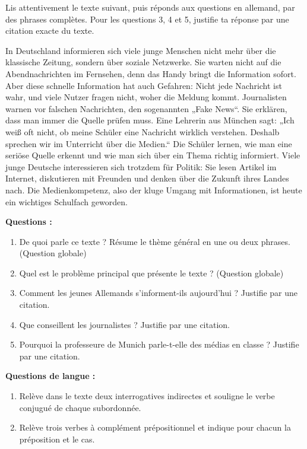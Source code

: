 \documentclass[11pt]{article}
\begin{document}
\begin{exercice}
Lis attentivement le texte suivant, puis réponds aux questions en allemand, par des phrases complètes. Pour les questions 3, 4 et 5, justifie ta réponse par une citation exacte du texte.

\begin{textebox}
In Deutschland informieren sich viele junge Menschen nicht mehr über die klassische Zeitung, sondern über soziale Netzwerke. Sie warten nicht auf die Abendnachrichten im Fernsehen, denn das Handy bringt die Information sofort. Aber diese schnelle Information hat auch Gefahren: Nicht jede Nachricht ist wahr, und viele Nutzer fragen nicht, woher die Meldung kommt. Journalisten warnen vor falschen Nachrichten, den sogenannten „Fake News“. Sie erklären, dass man immer die Quelle prüfen muss. Eine Lehrerin aus München sagt: „Ich weiß oft nicht, ob meine Schüler eine Nachricht wirklich verstehen. Deshalb sprechen wir im Unterricht über die Medien.“ Die Schüler lernen, wie man eine seriöse Quelle erkennt und wie man sich über ein Thema richtig informiert. Viele junge Deutsche interessieren sich trotzdem für Politik: Sie lesen Artikel im Internet, diskutieren mit Freunden und denken über die Zukunft ihres Landes nach. Die Medienkompetenz, also der kluge Umgang mit Informationen, ist heute ein wichtiges Schulfach geworden.
\end{textebox}

\textbf{Questions :}
\begin{enumerate}
\item De quoi parle ce texte ? Résume le thème général en une ou deux phrases. (Question globale)
\item Quel est le problème principal que présente le texte ? (Question globale)
\item Comment les jeunes Allemands s'informent-ils aujourd'hui ? Justifie par une citation.
\item Que conseillent les journalistes ? Justifie par une citation.
\item Pourquoi la professeure de Munich parle-t-elle des médias en classe ? Justifie par une citation.
\end{enumerate}

\textbf{Questions de langue :}
\begin{enumerate}
\item Relève dans le texte deux interrogatives indirectes et souligne le verbe conjugué de chaque subordonnée.
\item Relève trois verbes à complément prépositionnel et indique pour chacun la préposition et le cas.
\end{enumerate}
\end{exercice}
\end{document}
